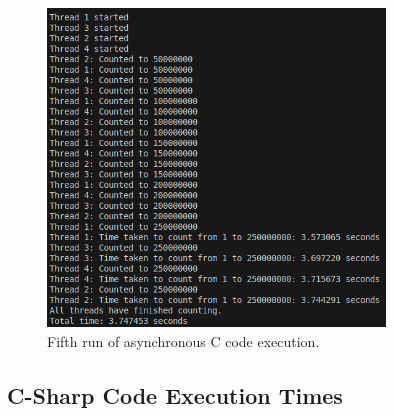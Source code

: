 \documentclass[12pt,a4paper]{article}
\begin{document}
\begin{figure}[htbp]
    \centering
    \includegraphics[width=0.8\textwidth]{../async_records/results_c/result_5.png}
    \caption{Fifth run of asynchronous C code execution.}
    \label{fig:C-async-runtime-5}
\end{figure}

\clearpage
\subsection{C-Sharp Code Execution Times} 
\end{document}

